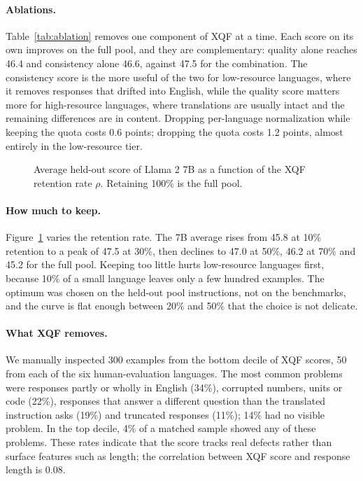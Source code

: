 \documentclass{article}
\begin{document}
\paragraph{Ablations.}
Table~\ref{tab:ablation} removes one component of XQF at a time. Each score on its own improves on the full pool, and they are complementary: quality alone reaches 46.4 and consistency alone 46.6, against 47.5 for the combination. The consistency score is the more useful of the two for low-resource languages, where it removes responses that drifted into English, while the quality score matters more for high-resource languages, where translations are usually intact and the remaining differences are in content. Dropping per-language normalization while keeping the quota costs 0.6 points; dropping the quota costs 1.2 points, almost entirely in the low-resource tier.

\begin{figure}[t]
\centering
{}
\caption{Average held-out score of Llama 2 7B as a function of the XQF retention rate $\rho$. Retaining 100\% is the full pool.}
\label{fig:rate}
\end{figure}

\paragraph{How much to keep.}
Figure~\ref{fig:rate} varies the retention rate. The 7B average rises from 45.8 at 10\% retention to a peak of 47.5 at 30\%, then declines to 47.0 at 50\%, 46.2 at 70\% and 45.2 for the full pool. Keeping too little hurts low-resource languages first, because 10\% of a small language leaves only a few hundred examples. The optimum was chosen on the held-out pool instructions, not on the benchmarks, and the curve is flat enough between 20\% and 50\% that the choice is not delicate.

\paragraph{What XQF removes.}
We manually inspected 300 examples from the bottom decile of XQF scores, 50 from each of the six human-evaluation languages. The most common problems were responses partly or wholly in English (34\%), corrupted numbers, units or code (22\%), responses that answer a different question than the translated instruction asks (19\%) and truncated responses (11\%); 14\% had no visible problem. In the top decile, 4\% of a matched sample showed any of these problems. These rates indicate that the score tracks real defects rather than surface features such as length; the correlation between XQF score and response length is 0.08.
\end{document}
